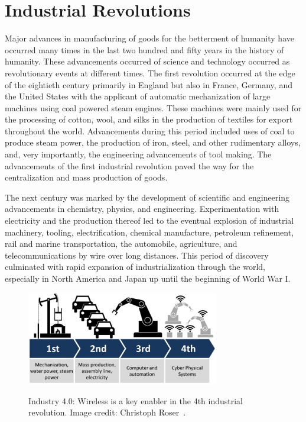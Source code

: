 \section{Industrial Revolutions}
Major advances in manufacturing of goods for the betterment of humanity have occurred many times in the last two hundred and fifty years in the history of humanity.  These advancements occurred of science and technology occurred as revolutionary events at different times.  The first revolution occurred at the edge of the eightieth century primarily in England but also in France, Germany, and the United States with the applicant of automatic mechanization of large machines using coal powered steam engines.  These machines were mainly used for the processing of cotton, wool, and silks in the production of textiles for export throughout the world.  Advancements during this period included uses of coal to produce steam power, the production of iron, steel, and other rudimentary alloys, and, very importantly, the engineering advancements of tool making.  The advancements of the first industrial revolution paved the way for the centralization and mass production of goods.

The next century was marked by the development of scientific and engineering advancements in chemistry, physics, and engineering. Experimentation with electricity and the production thereof led to the eventual explosion of industrial machinery, tooling, electrification, chemical manufacture, petroleum refinement, rail and marine transportation, the automobile, agriculture, and telecommunications by wire over long distances.  This period of discovery culminated with rapid expansion of industrialization through the world, especially in North America and Japan up until the beginning of World War I.

\begin{figure}[!tbp]
	\begin{center}
		\includegraphics[width=0.75\textwidth]{chapter-intro/images/forbes_2016_03_Industry_4.0}
		\label{fig:intro:forbes-i40-evolution}
		\caption{Industry 4.0: Wireless is a key enabler in the 4th industrial revolution. Image credit: Christoph Roser~\cite{Roser2019}.}
	\end{center}
\end{figure}

